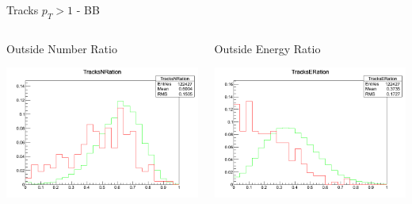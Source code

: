 \documentclass[8pt]{beamer}
\begin{document}
\begin{frame}{Tracks $p_T>1$ - BB}

\begin{columns}
 
\begin{block}{Outside Number Ratio}
 
\includegraphics[width=\linewidth]{img/BB_Tracks1_TracksNRatio.png}

\end{block}

\begin{block}{Outside Energy Ratio}
 
\includegraphics[width=\linewidth]{img/BB_Tracks1_TracksERatio.png}
 
\end{block}

\end{columns}

\end{frame}
\end{document}
